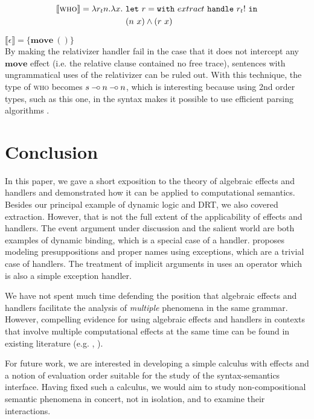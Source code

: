 \documentclass{article}
\newcommand{\sem}[1]{\llbracket #1 \rrbracket}
\newcommand{\keyword}[1]{\texttt{#1}}
\newcommand{\effect}[1]{\textbf{#1}}
\newcommand{\handle}[2]{\keyword{with}\ #1\ \keyword{handle}\ #2}
\def\limp {\mathbin{{-}\mkern-3.5mu{\circ}}}
\begin{document}
\begin{align*}
  \sem{\textsc{who}} = \lambda r_t n. \lambda x.\ & \keyword{let}\ r =
  \handle{extract}{r_t!}\ \keyword{in} \\
   & (n\ x) \land (r\ x) \\
\end{align*}

\vspace{-8mm}

\hspace{2.5cm} $ \sem{\epsilon} = \{ \effect{move}\ () \} $ \\

By making the relativizer handler fail in the case that it does not intercept
any $\effect{move}$ effect (i.e. the relative clause contained no free trace),
sentences with ungrammatical uses of the relativizer can be ruled out. With
this technique, the type of \textsc{who} becomes $s \limp n \limp n$, which is
interesting because using 2nd order types, such as this one, in the syntax
makes it possible to use efficient parsing algorithms
\citep{kanazawa2007parsing}.


\section{Conclusion}

In this paper, we gave a short exposition to the theory of algebraic effects
and handlers and demonstrated how it can be applied to computational
semantics. Besides our principal example of dynamic logic and DRT, we also
covered extraction. However, that is not the full extent of the applicability
of effects and handlers. The event argument under discussion
\citep{qian2011event} and the salient world are both examples of dynamic
binding, which is a special case of a handler. \citet{lebedeva2012expression}
proposes modeling presuppositions and proper names using exceptions, which are
a trivial case of handlers. The treatment of implicit arguments in
\citet{blom2012implicit} uses an operator which is also a simple exception
handler.

We have not spent much time defending the position that algebraic effects and
handlers facilitate the analysis of \emph{multiple} phenomena in the same
grammar. However, compelling evidence for using algebraic effects and handlers
in contexts that involve multiple computational effects at the same time can
be found in existing literature (e.g. \citet{kiselyov2013extensible},
\citet{cartwright1994extensible}).

For future work, we are interested in developing a simple calculus with
effects and a notion of evaluation order suitable for the study of the
syntax-semantics interface. Having fixed such a calculus, we would aim to
study non-compositional semantic phenomena in concert, not in isolation, and
to examine their interactions.




\end{document}
